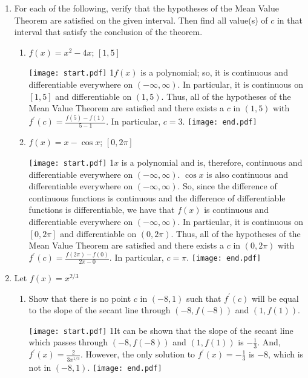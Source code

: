 \documentclass[12pt]{article}
\begin{document}
\begin{enumerate}
\begin{enumerate}
\end{enumerate}

\item For each of the following, verify that the hypotheses of the Mean Value Theorem are satisfied on the given interval. Then find all value(s) of $c$ in that interval that satisfy the conclusion of the theorem.

\begin{enumerate}

\item $f(x)=x^2-4x$; $[1,5]$

\texttt{[image: start.pdf]}
{{{1\linewidth}{$f(x)$ is a polynomial; so, it is continuous and differentiable everywhere on $(-\infty,\infty)$.  In particular, it is continuous on $[1,5]$ and differentiable on $(1,5)$.  Thus, all of the hypotheses of the Mean Value Theorem are satisfied and there exists a $c$ in $(1,5)$ with $f^{\prime}(c)=\frac{f(5)-f(1)}{5-1}$.  In particular, $c=3$.}}}
\texttt{[image: end.pdf]}


\item $f(x)=x-\cos{x}$; $[0,2\pi]$

\texttt{[image: start.pdf]}
{{{1\linewidth}{$x$ is a polynomial and is, therefore, continuous and differentiable everywhere on $(-\infty,\infty)$.  $\cos{x}$ is also continuous and differentiable everywhere on $(-\infty,\infty)$.  So, since the difference of continuous functions is continuous and the difference of differentiable functions is differentiable, we have that $f(x)$  is continuous and differentiable everywhere on $(-\infty,\infty)$.  In particular, it is continuous on $[0,2\pi]$ and differentiable on $(0,2\pi)$.  Thus, all of the hypotheses of the Mean Value Theorem are satisfied and there exists a $c$ in $(0,2\pi)$ with $f^{\prime}(c)=\frac{f(2\pi)-f(0)}{2\pi-0}$.  In particular, $c=\pi$.}}}
\texttt{[image: end.pdf]}


\end{enumerate}

\item Let $f(x)=x^{2/3}$

\begin{enumerate}

\item Show that there is no point $c$ in $(-8,1)$ such that $f^{\prime}(c)$ will be equal to the slope of the secant line through $(-8,f(-8))$ and $(1,f(1))$.

\texttt{[image: start.pdf]}
{{{1\linewidth}{It can be shown that the slope of the secant line which passes through $(-8,f(-8))$ and $(1,f(1))$ is $-\frac{1}{3}$.  And, $f^{\prime}(x)=\frac{2}{3x^{1/3}}$.  However, the only solution to $f^{\prime}(x)=-\frac{1}{3}$ is $-8$, which is not in $(-8,1)$.}}}
\texttt{[image: end.pdf]}



\end{enumerate}
\end{enumerate}
\end{document}
